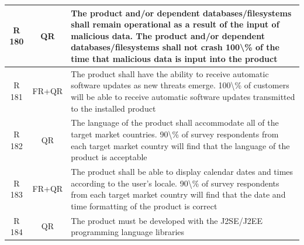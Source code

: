 \documentclass[dissertation,final]{softeng}
\begin{document}
\begin{appendices}
{\begin{center}
\begin{longtable}{c c m{}}
    R 180   & QR & The product and/or dependent databases/filesystems shall remain operational as a result of the input of malicious data. The product and/or dependent databases/filesystems shall not crash 100\textbackslash{}\% of the time that malicious data is input into the product \\    \midrule
    R 181   & FR+QR & The product shall have the ability to receive automatic software updates as new threats emerge. 100\textbackslash{}\% of customers will be able to receive automatic software updates transmitted to the installed product \\    \midrule
    R 182   & QR & The language of the product shall accommodate all of the target market countries. 90\textbackslash{}\% of survey respondents from each target market country will find that the language of the product is acceptable \\    \midrule
    R 183   & FR+QR & The product shall be able to display calendar dates and times according to the user's locale. 90\textbackslash{}\% of survey respondents from each target market country will find that the date and time formatting of the product is correct \\    \midrule
    R 184   & QR & The product must be developed with the J2SE/J2EE programming language libraries \\
\end{longtable}
\end{center}
}


\end{appendices}
\end{document}
